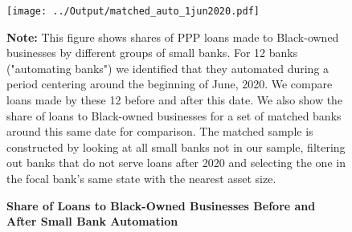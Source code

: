 \documentclass[11pt]{article}
\begin{document}
\newpage
\begin{figure}[H]
	\caption{\textbf{Share of Loans to Black-Owned Businesses Before and After Small Bank Automation}} \label{f:auto}
	\centering
	 		\texttt{[image: ../Output/matched\_auto\_1jun2020.pdf]}
	\begin{minipage}{\textwidth} \medskip
		\footnotesize{{\bf Note: }This figure shows shares of PPP loans made to Black-owned businesses by different groups of small banks. For 12 banks ("automating banks") we identified that they automated during a period centering around the beginning of June, 2020. We compare loans made by these 12 before and after this date. We also show the share of loans to Black-owned businesses for a set of matched banks around this same date for comparison. The matched sample is constructed by looking at all small banks not in our sample, filtering out banks that do not serve loans after 2020 and selecting the one in the focal bank's same state with the nearest asset size.}
	\end{minipage}
\end{figure}
\end{document}

